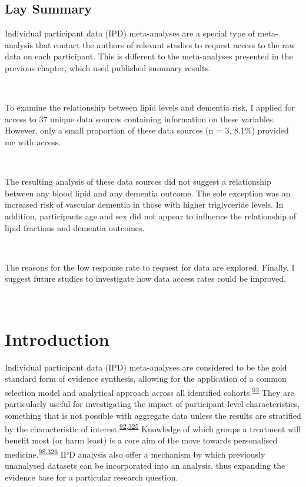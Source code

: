 \documentclass[a4paper, twoside]{templates/ociamthesis}
\begin{document}
\minitoc 

\begin{laybox}

\hypertarget{lay-summary-5}{%
\section{Lay Summary}\label{lay-summary-5}}

Individual participant data (IPD) meta-analyses are a special type of meta-analysis that contact the authors of relevant studies to request access to the raw data on each participant. This is different to the meta-analyses presented in the previous chapter, which used published summary results.

~

To examine the relationship between lipid levels and dementia risk, I applied for access to 37 unique data sources containing information on these variables. However, only a small proportion of these data sources (n = 3, 8.1\%) provided me with access.

~

The resulting analysis of these data sources did not suggest a relationship between any blood lipid and any dementia outcome. The sole exception was an increased risk of vascular dementia in those with higher triglyceride levels. In addition, participants age and sex did not appear to influence the relationship of lipid fractions and dementia outcomes.

~

The reasons for the low response rate to request for data are explored. Finally, I suggest future studies to investigate how data access rates could be improved.

\end{laybox}

~

\hypertarget{introduction-3}{%
\section{Introduction}\label{introduction-3}}

Individual participant data (IPD) meta-analyses are considered to be the gold standard form of evidence synthesis, allowing for the application of a common selection model and analytical approach across all identified cohorts.\textsuperscript{\protect\hyperlink{ref-riley2010}{92}} They are particularly useful for investigating the impact of participant-level characteristics, something that is not possible with aggregate data unless the results are stratified by the characteristic of interest.\textsuperscript{\protect\hyperlink{ref-riley2010}{92},\protect\hyperlink{ref-thompson2005}{325}} Knowledge of which groups a treatment will benefit most (or harm least) is a core aim of the move towards personalised medicine.\textsuperscript{\protect\hyperlink{ref-riley2020}{98},\protect\hyperlink{ref-hingorani2013}{326}}
IPD analysis also offer a mechanism by which previously unanalysed datasets can be incorporated into an analysis, thus expanding the evidence base for a particular research question.
\end{document}
